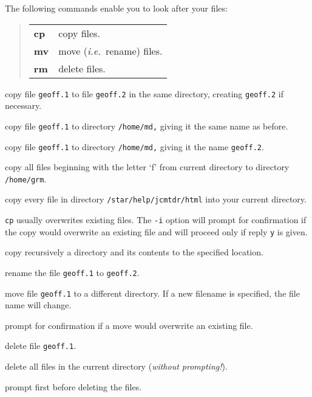 The following commands enable you to look after your files:

\begin{quote}
\begin{tabular}{lp{67mm}}

{\bf cp}  & copy files.\\
{\bf mv}  & move ({\em i.e.}\ rename) files.\\
{\bf rm}  & delete files.

\end{tabular}
\end{quote}

\exbegin

{copy file {\tt geoff.1} to file {\tt geoff.2} in the same directory, creating
{\tt geoff.2} if necessary.}

{copy file {\tt geoff.1} to directory {\tt /home/md,} giving it the same name
as before.}

{copy file {\tt geoff.1} to directory {\tt /home/md,} giving it the name
{\tt geoff.2}.}

{copy all files beginning with the letter `f' from current directory to
directory {\tt /home/grm}.}

{copy every file in directory {\tt /star/help/jcmtdr/html} into your current
directory.}

{{\tt cp} usually overwrites existing files. The {\tt -i} option will prompt
for confirmation if the copy would overwrite an existing file and will proceed
only if reply {\tt y} is given.}

{copy recursively a directory and its contents to the specified location.}

{rename the file {\tt geoff.1} to {\tt geoff.2}.}

{move file {\tt geoff.1} to a different directory.
If a new filename is specified, the file name will change.}

{prompt for confirmation if a move would overwrite an existing file.}

{delete file {\tt geoff.1}.}

{delete all files in the current directory ({\it without prompting!}).}

{prompt first before deleting the files.}

